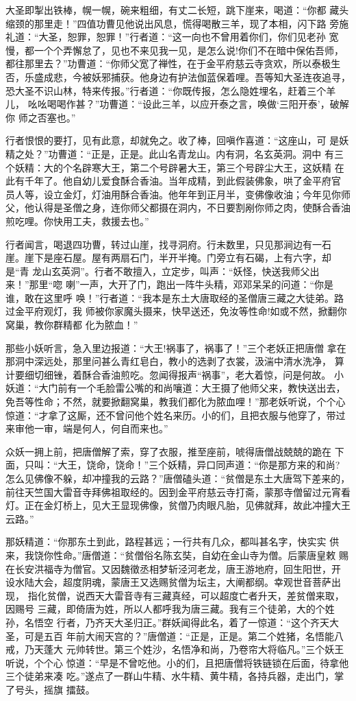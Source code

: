 大圣即掣出铁棒，幌一幌，碗来粗细，有丈二长短，跳下崖来，喝道：“你都
藏头缩颈的那里走！”四值功曹见他说出风息，慌得喝散三羊，现了本相，闪下路
旁施礼道：“大圣，恕罪，恕罪！”行者道：“这一向也不曾用着你们，你们见老孙
宽慢，都一个个弄懈怠了，见也不来见我一见，是怎么说!你们不在暗中保佑吾师，
都往那里去？”功曹道：“你师父宽了禅性，在于金平府慈云寺贪欢，所以泰极生
否，乐盛成悲，今被妖邪捕获。他身边有护法伽蓝保着哩。吾等知大圣连夜追寻，
恐大圣不识山林，特来传报。”行者道：“你既传报，怎么隐姓埋名，赶着三个羊儿，
吆吆喝喝作甚？”功曹道：“设此三羊，以应开泰之言，唤做‘三阳开泰’，破解你
师之否塞也。”

行者恨恨的要打，见有此意，却就免之。收了棒，回嗔作喜道：“这座山，可
是妖精之处？”功曹道：“正是，正是。此山名青龙山。内有洞，名玄英洞。洞中
有三个妖精：大的个名辟寒大王，第二个号辟暑大王，第三个号辟尘大王，这妖精
在此有千年了。他自幼儿爱食酥合香油。当年成精，到此假装佛象，哄了金平府官
员人等，设立金灯，灯油用酥合香油。他年年到正月半，变佛像收油；今年见你师
父，他认得是圣僧之身，连你师父都摄在洞内，不日要割剐你师之肉，使酥合香油
煎吃哩。你快用工夫，救援去也。”

行者闻言，喝退四功曹，转过山崖，找寻洞府。行未数里，只见那涧边有一石
崖。崖下是座石屋。屋有两扇石门，半开半掩。门旁立有石碣，上有六字，却是“青
龙山玄英洞”。行者不敢擅入，立定步，叫声：“妖怪，快送我师父出来！”那里“唿
喇”一声，大开了门，跑出一阵牛头精，邓邓呆呆的问道：“你是谁，敢在这里呼
唤！”行者道：“我本是东土大唐取经的圣僧唐三藏之大徒弟。路过金平府观灯，我
师被你家魔头摄来，快早送还，免汝等性命!如或不然，掀翻你窝巢，教你群精都
化为脓血！”

那些小妖听言，急入里边报道：“大王!祸事了，祸事了！”三个老妖正把唐僧
拿在那洞中深远处，那里问甚么青红皂白，教小的选剥了衣裳，汲湍中清水洗净，
算计要细切细锉，着酥合香油煎吃。忽闻得报声“祸事”，老大着惊，问是何故。
小妖道：“大门前有一个毛脸雷公嘴的和尚嚷道：大王摄了他师父来，教快送出去，
免吾等性命；不然，就要掀翻窝巢，教我们都化为脓血哩！”那老妖听说，个个心
惊道：“才拿了这厮，还不曾问他个姓名来历。小的们，且把衣服与他穿了，带过
来审他一审，端是何人，何自而来也。”

众妖一拥上前，把唐僧解了索，穿了衣服，推至座前，唬得唐僧战兢兢的跪在
下面，只叫：“大王，饶命，饶命！”三个妖精，异口同声道：“你是那方来的和尚?
怎么见佛像不躲，却冲撞我的云路？”唐僧磕头道：“贫僧是东土大唐驾下差来的，
前往天竺国大雷音寺拜佛祖取经的。因到金平府慈云寺打斋，蒙那寺僧留过元宵看
灯。正在金灯桥上，见大王显现佛像，贫僧乃肉眼凡胎，见佛就拜，故此冲撞大王
云路。”

那妖精道：“你那东土到此，路程甚远；一行共有几众，都叫甚名字，快实实
供来，我饶你性命。”唐僧道：“贫僧俗名陈玄奘，自幼在金山寺为僧。后蒙唐皇敕
赐在长安洪福寺为僧官。又因魏徵丞相梦斩泾河老龙，唐王游地府，回生阳世，开
设水陆大会，超度阴魂，蒙唐王又选赐贫僧为坛主，大阐都纲。幸观世音菩萨出现，
指化贫僧，说西天大雷音寺有三藏真经，可以超度亡者升天，差贫僧来取，因赐号
三藏，即倚唐为姓，所以人都呼我为唐三藏。我有三个徒弟，大的个姓孙，名悟空
行者，乃齐天大圣归正。”群妖闻得此名，着了一惊道：“这个齐天大圣，可是五百
年前大闹天宫的？”唐僧道：“正是，正是。第二个姓猪，名悟能八戒，乃天蓬大
元帅转世。第三个姓沙，名悟净和尚，乃卷帘大将临凡。”三个妖王听说，个个心
惊道：“早是不曾吃他。小的们，且把唐僧将铁链锁在后面，待拿他三个徒弟来凑
吃。”遂点了一群山牛精、水牛精、黄牛精，各持兵器，走出门，掌了号头，摇旗
擂鼓。

